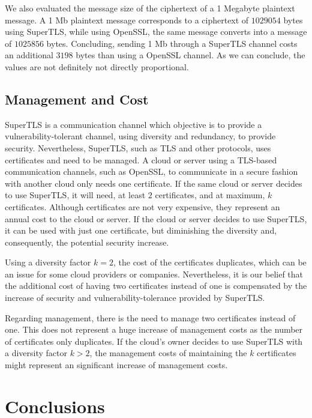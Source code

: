 \documentclass{sig-alternate-05-2015}
\begin{document}
We also evaluated the message size of the ciphertext of a 1 Megabyte plaintext message. A 1 Mb plaintext message corresponds to a ciphertext of $1 029 054$ bytes using SuperTLS, while using OpenSSL, the same message converts into a message of $1 025 856$ bytes. Concluding, sending 1 Mb through a SuperTLS channel costs an additional $3 198$ bytes than using a OpenSSL channel.
As we can conclude, the values are not definitely not directly proportional.

\subsection{Management and Cost}

SuperTLS is a communication channel which objective is to provide a vulnerability-tolerant channel, using diversity and redundancy, to provide security. Nevertheless, SuperTLS, such as TLS and other protocols, uses certificates and need to be managed.
A cloud or server using a TLS-based communication channels, such as OpenSSL, to communicate in a secure fashion with another cloud only needs one certificate. If the same cloud or server decides to use SuperTLS, it will need, at least $2$ certificates, and at maximum, $k$ certificates. Although certificates are not very expensive, they represent an annual cost to the cloud or server. If the cloud or server decides to use SuperTLS, it can be used with just one certificate, but diminishing the diversity and, consequently, the potential security increase.

Using a diversity factor $k = 2$, the cost of the certificates duplicates, which can be an issue for some cloud providers or companies. Nevertheless, it is our belief that the additional cost of having two certificates instead of one is compensated by the increase of security and vulnerability-tolerance provided by SuperTLS.

Regarding management, there is the need to manage two certificates instead of one. This does not represent a huge increase of management costs as the number of certificates only duplicates. If the cloud's owner decides to use SuperTLS with a diversity factor $k > 2$, the management costs of maintaining the $k$ certificates might represent an significant increase of management costs.

\section{Conclusions}
\end{document}
